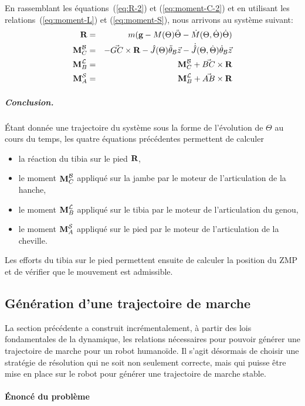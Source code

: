 En rassemblant les équations (\ref{eq:R-2}) et (\ref{eq:moment-C-2})
et en utilisant les relations (\ref{eq:moment-L}) et
(\ref{eq:moment-S}), nous arrivons au système suivant:
\begin{eqnarray}
\textbf{R}&=& m(\textbf{g} - M(\Theta)\ddot{\Theta} - \dot{M}(\Theta,\dot{\Theta})\dot{\Theta})\\
\textbf{M}^{\cal B}_C&=& -\vec{GC}\times \textbf{R} -
\hat{J}(\Theta) \ddot{\theta}_{\cal B} \vec{z} -
\dot{\hat{J}}(\Theta,\dot{\Theta})\dot{\theta}_{\cal B} \vec{z}\\
\textbf{M}^{\cal L}_B &=& \textbf{M}^{\cal B}_C + \vec{BC}\times \textbf{R}  \\
\textbf{M}^{\cal S}_A &=&\textbf{M}^{\cal L}_B + \vec{AB}\times \textbf{R}
\end{eqnarray}

\subparagraph{Conclusion.} Étant donnée une trajectoire du système sous
la forme de l'évolution de $\Theta$ au cours du temps, les quatre
équations précédentes permettent de calculer
\begin{itemize}
  \item la réaction du tibia sur le pied $\textbf{R}$,
  \item le moment $\textbf{M}^{\cal B}_C$ appliqué sur la jambe par le moteur de
    l'articulation de la hanche,
  \item le moment $\textbf{M}^{\cal L}_B$ appliqué sur le tibia par le
    moteur de l'articulation du genou,
    \item le moment $\textbf{M}^{\cal S}_A$ appliqué sur le pied par le
      moteur de l'articulation de la cheville.
\end{itemize}
Les efforts du tibia sur le pied permettent ensuite de calculer la
position du ZMP et de vérifier que le mouvement est admissible.


\subsection{Génération d'une trajectoire de marche}

La section précédente a construit incrémentalement, à partir des lois
fondamentales de la dynamique, les relations nécessaires pour pouvoir
générer une trajectoire de marche pour un robot humanoïde. Il s'agit
désormais de choisir une stratégie de résolution qui ne soit non
seulement correcte, mais qui puisse être mise en place sur le robot
pour générer une trajectoire de marche stable.

\paragraph{Énoncé du problème}

